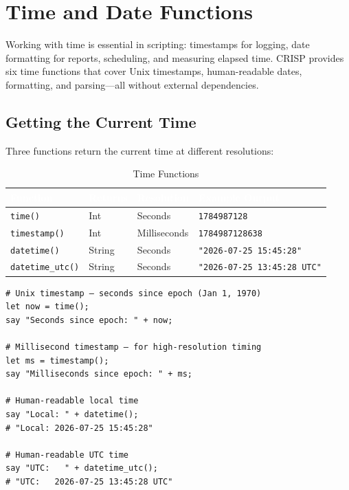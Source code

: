 \section{Time and Date Functions}

Working with time is essential in scripting: timestamps for logging, date formatting for reports, scheduling, and measuring elapsed time. CRISP provides six time functions that cover Unix timestamps, human-readable dates, formatting, and parsing—all without external dependencies.

\subsection{Getting the Current Time}

Three functions return the current time at different resolutions:

\begin{table}[H]
\centering
{}
\caption{\textcolor{darkpurple}{Time Functions}}
\vspace{0.3em}
\begin{tabular}{@{}lllp{6cm}@{}}
\toprule
\rowcolor{softvioletdark}
\textbf{\textcolor{white}{Function}} & \textbf{\textcolor{white}{Returns}} & \textbf{\textcolor{white}{Resolution}} & \textbf{\textcolor{white}{Example Output}} \\
\midrule
\texttt{time()} & Int & Seconds & \texttt{1784987128} \\
\texttt{timestamp()} & Int & Milliseconds & \texttt{1784987128638} \\
\texttt{datetime()} & String & Seconds & \texttt{"2026-07-25 15:45:28"} \\
\texttt{datetime\_utc()} & String & Seconds & \texttt{"2026-07-25 13:45:28 UTC"} \\
\bottomrule
\end{tabular}
\end{table}

\vspace{1.5cm}
\begin{tcolorbox}[colback=codebg, colframe=darkpurple, colbacktitle=darkpurple, title=\textbf{\textcolor{codegold}{Basic Time Functions}}, fonttitle=\bfseries, sharp corners]
\begin{lstlisting}
# Unix timestamp — seconds since epoch (Jan 1, 1970)
let now = time();
say "Seconds since epoch: " + now;

# Millisecond timestamp — for high-resolution timing
let ms = timestamp();
say "Milliseconds since epoch: " + ms;

# Human-readable local time
say "Local: " + datetime();
# "Local: 2026-07-25 15:45:28"

# Human-readable UTC time
say "UTC:   " + datetime_utc();
# "UTC:   2026-07-25 13:45:28 UTC"
\end{lstlisting}
\end{tcolorbox}

